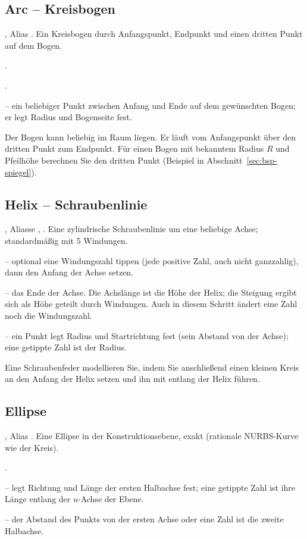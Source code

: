 \subsection{Arc -- Kreisbogen}\label{sec:cmd-arc}
, Alias . Ein Kreisbogen durch Anfangspunkt, Endpunkt und einen dritten Punkt
auf dem Bogen.
\begin{schritte}
\item {}.
\item {}.
\item {} -- ein beliebiger Punkt zwischen Anfang und Ende auf dem
  gewünschten Bogen; er legt Radius und Bogenseite fest.
\end{schritte}
Der Bogen kann beliebig im Raum liegen. Er läuft vom Anfangspunkt über den dritten Punkt zum
Endpunkt. Für einen Bogen mit bekanntem Radius $R$ und Pfeilhöhe berechnen Sie den dritten Punkt
(Beispiel in Abschnitt~\ref{sec:bsp-spiegel}).

\subsection{Helix -- Schraubenlinie}\label{sec:cmd-helix}
, Aliasse , . Eine zylindrische Schraubenlinie um eine beliebige
Achse; standardmäßig mit 5 Windungen.
\begin{schritte}
\item {} -- optional eine
  Windungszahl tippen (jede positive Zahl, auch nicht ganzzahlig), dann den Anfang der Achse
  setzen.
\item {} -- das Ende der Achse. Die Achslänge ist die Höhe der
  Helix; die Steigung ergibt sich als Höhe geteilt durch Windungen. Auch in diesem Schritt
  ändert eine Zahl noch die Windungszahl.
\item {} -- ein Punkt legt Radius und
  Startrichtung fest (sein Abstand von der Achse); eine getippte Zahl ist der Radius.
\end{schritte}
Eine Schraubenfeder modellieren Sie, indem Sie anschließend einen kleinen Kreis an den
Anfang der Helix setzen und ihn mit  entlang der Helix führen.

\subsection{Ellipse}\label{sec:cmd-ellipse}
, Alias . Eine Ellipse in der Konstruktionsebene, exakt (rationale
NURBS-Kurve wie der Kreis).
\begin{schritte}
\item {}.
\item {} -- legt Richtung und Länge der ersten Halbachse
  fest; eine getippte Zahl ist ihre Länge entlang der $u$-Achse der Ebene.
\item {} -- der Abstand des Punkts von der ersten
  Achse oder eine Zahl ist die zweite Halbachse.
\end{schritte}

